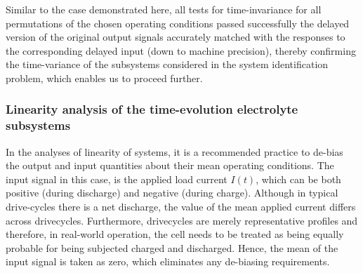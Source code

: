Similar to  the case demonstrated  here, all  tests for time-invariance  for all
permutations of  the chosen operating  conditions passed successfully  \ie{} the
delayed  version of  the original  output  signals accurately  matched with  the
responses  to  the corresponding  delayed  input  (down to  machine  precision),
thereby confirming the time-variance of  the subsystems considered in the system
identification problem, which enables us to proceed further.


\subsubsection*{Linearity   analysis    of   the    time-evolution   electrolyte
subsystems}\label{subsubsec:linearityanalysis}

In the analyses of linearity of systems, it is a recommended practice to de-bias
the output and input quantities about their mean operating conditions. The input
signal in  this case,  is the  applied load  current $I(t)$,  which can  be both
positive (during  discharge) and negative  (during charge). Although  in typical
drive-cycles there  is a net  discharge, the value  of the mean  applied current
differs across  drivecycles. Furthermore, drivecycles are  merely representative
profiles and therefore, in real-world operation, the cell needs to be treated as
being equally  probable for being  subjected charged and discharged.  Hence, the
mean  of the  input signal  is taken  as zero,  which eliminates  any de-biasing
requirements.

